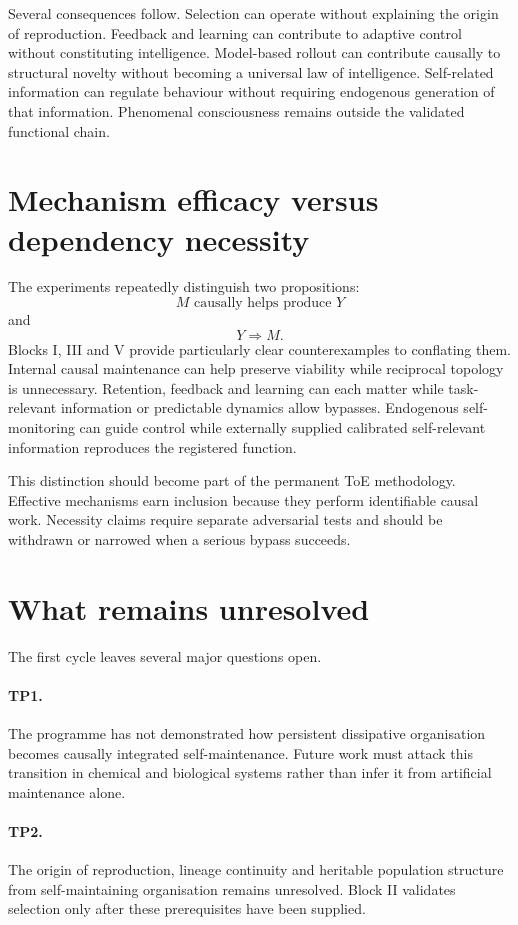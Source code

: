 \documentclass[11pt,a4paper]{article}
\begin{document}
Several consequences follow. Selection can operate without explaining the origin of reproduction. Feedback and learning can contribute to adaptive control without constituting intelligence. Model-based rollout can contribute causally to structural novelty without becoming a universal law of intelligence. Self-related information can regulate behaviour without requiring endogenous generation of that information. Phenomenal consciousness remains outside the validated functional chain.

\section{Mechanism efficacy versus dependency necessity}

The experiments repeatedly distinguish two propositions:
\[
M \text{ causally helps produce } Y
\]
and
\[
Y \Rightarrow M.
\]
Blocks I, III and V provide particularly clear counterexamples to conflating them. Internal causal maintenance can help preserve viability while reciprocal topology is unnecessary. Retention, feedback and learning can each matter while task-relevant information or predictable dynamics allow bypasses. Endogenous self-monitoring can guide control while externally supplied calibrated self-relevant information reproduces the registered function.

This distinction should become part of the permanent ToE methodology. Effective mechanisms earn inclusion because they perform identifiable causal work. Necessity claims require separate adversarial tests and should be withdrawn or narrowed when a serious bypass succeeds.

\section{What remains unresolved}

The first cycle leaves several major questions open.

\paragraph{TP1.} The programme has not demonstrated how persistent dissipative organisation becomes causally integrated self-maintenance. Future work must attack this transition in chemical and biological systems rather than infer it from artificial maintenance alone.

\paragraph{TP2.} The origin of reproduction, lineage continuity and heritable population structure from self-maintaining organisation remains unresolved. Block II validates selection only after these prerequisites have been supplied.
\end{document}
